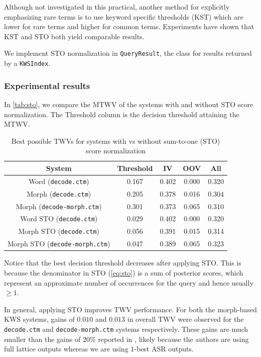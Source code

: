 \documentclass[a4paper,oneside,reqno]{amsart}
\begin{document}
Although not investigated in this practical, another method for explicitly
emphasizing rare terms is to use keyword specific thresholds (KST) which are lower
for rare terms and higher for common terms. Experiments have shown that KST and STO
both yield comparable results\cite{wang2014depth}.



We implement STO normalization in \texttt{QueryResult}, the class for results
returned by a \texttt{KWSIndex}.

\subsubsection{Experimental results}

In \autoref{tab:sto}, we compare the MTWV of the systems with and without STO
score normalization. The Threshold column is the decision threshold attaining
the MTWV.

\begin{table}[ht!]
  \begin{tabular}{ccccc}
    \toprule
    System                                & Threshold & IV    & OOV   & All \\
    \midrule
    Word (\texttt{decode.ctm})            & 0.167     & 0.402 & 0.000 & 0.320 \\
    Morph (\texttt{decode.ctm})           & 0.205     & 0.378 & 0.016 & 0.304 \\
    Morph (\texttt{decode-morph.ctm})     & 0.301     & 0.373 & 0.065 & 0.310 \\
    \hline
    Word STO (\texttt{decode.ctm})        & 0.029     & 0.402 & 0.000 & 0.320 \\
    Morph STO (\texttt{decode.ctm})       & 0.056     & 0.391 & 0.015 & 0.314 \\
    Morph STO (\texttt{decode-morph.ctm}) & 0.047     & 0.389 & 0.065 & 0.323 \\
    \bottomrule
  \end{tabular}
  \caption{Best possible TWVs for systems with vs without sum-to-one (STO) score normalization}
  \label{tab:sto}
\end{table}

Notice that the best decision threshold decreases after applying STO. This is
because the denominator in STO (\autoref{eq:sto}) is a sum of posterior scores,
which represent an approximate number of occurrences for the query and hence
usually $\geq 1$.

In general, applying STO improves TWV performance. For both the morph-based KWS
systems, gains of $0.010$ and $0.013$ in overall TWV were observed for the
\texttt{decode.ctm} and \texttt{decode-morph.ctm} systems respectively.  These
gains are much smaller than the gains of $20\%$ reported in
\cite{mamou2013system}, likely because the authors are using full lattice
outputs whereas we are using $1$-best ASR outputs. %
\end{document}
